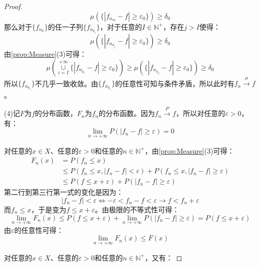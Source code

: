 \begin{proof}
	\begin{equation*}
		\mu(\{|f_{n_m}-f|\geqslant\varepsilon_0\})\geqslant\delta_0
	\end{equation*}
	那么对于$\{f_{n_k}\}$的任一子列$\{f_{n_{k_i}}\}$，对于任意的$I\in\mathbb{N}^+$，存在$j>I$使得：
	\begin{equation*}
		\mu(\{|f_{n_{k_j}}-f|\geqslant\varepsilon_0\})\geqslant\delta_0
	\end{equation*}
	由\cref{prop:Measure}(3)可得：
	\begin{equation*}
		\mu\left(\underset{i=I}{\overset{+\infty}{\cup}}\{|f_{n_{k_i}}-f|\geqslant\varepsilon_0\}\right)\geqslant\mu(\{|f_{n_{k_j}}-f|\geqslant\varepsilon_0\})\geqslant\delta_0
	\end{equation*}
	所以$\{f_{n_{k_i}}\}$不几乎一致收敛。由$\{f_{n_{k_i}}\}$的任意性可知与条件矛盾，所以此时有$f_n\overset{\mu}{\longrightarrow}f$。\par
	(4)记$F$为$f$的分布函数，$F_n$为$f_n$的分布函数。因为$f_n\overset{P}{\longrightarrow}f$，所以对任意的$\varepsilon>0$，有：
	\begin{equation*}
		\lim_{n\to+\infty}P(|f_n-f|\geqslant\varepsilon)=0
	\end{equation*}\par
	对任意的$x\in X$、任意的$\varepsilon>0$和任意的$n\in \mathbb{N}^+$，由\cref{prop:Measure}(3)可得：
	\begin{align*}
		F_n(x)&=P(f_n\leqslant x) \\
		&\leqslant P(f_n\leqslant x,|f_n-f|<\varepsilon)+P(f_n\leqslant x,|f_n-f|\geqslant\varepsilon) \\
		&\leqslant P(f\leqslant x+\varepsilon)+P(|f_n-f|\geqslant\varepsilon)
	\end{align*}
	第二行到第三行第一式的变化是因为：
	\begin{equation*}
		|f_n-f|<\varepsilon\Leftrightarrow-\varepsilon<f_n-f<\varepsilon\rightarrow f<f_n+\varepsilon
	\end{equation*}
	而$f_n\leqslant x$，于是变为$f\leqslant x+\varepsilon$。由极限的不等式性可得：
	\begin{equation*}
		\lim_{n\to+\infty}F_n(x)\leqslant P(f\leqslant x+\varepsilon)+\lim_{n\to+\infty}P(|f_n-f|\geqslant\varepsilon)=P(f\leqslant x+\varepsilon)
	\end{equation*}
	由$\varepsilon$的任意性可得：
	\begin{equation*}
		\lim_{n\to+\infty}F_n(x)\leqslant F(x)
	\end{equation*}\par
	对任意的$x\in X$、任意的$\varepsilon>0$和任意的$n\in \mathbb{N}^+$，又有：

\end{proof}
